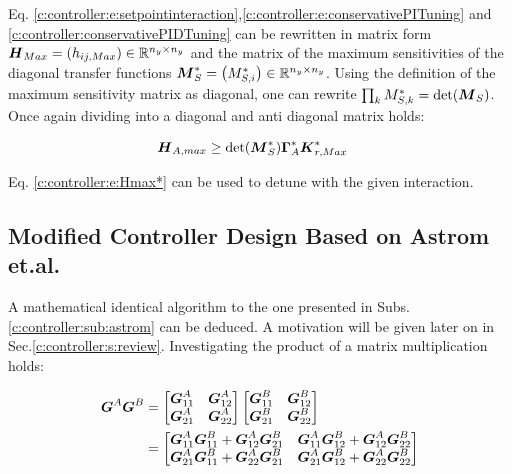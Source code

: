 Eq. \ref{c:controller:e:setpointinteraction},\ref{c:controller:e:conservativePITuning} and \ref{c:controller:conservativePIDTuning} can be rewritten in matrix form $\mbox{\boldmath$H$}_{Max} = \left(h_{ij,Max}\right) \in \mathbb{R}^{n_y \times n_y}$ and the matrix of the maximum sensitivities of the diagonal transfer functions $\mbox{\boldmath$M$}_S^* = \left(M_{S,i}^*\right) \in \mathbb{R}^{n_y \times n_y}$. Using the definition of the maximum sensitivity matrix as diagonal, one can rewrite $\prod_k M_{S,k}^* = \det(\mbox{\boldmath$M$}_S) $. Once again dividing into a diagonal and anti diagonal matrix holds:

\begin{align}
\begin{split}
\mbox{\boldmath$H$}_{A,max} &\geq \det(\mbox{\boldmath$M$}_S^*) \mbox{\boldmath$\Gamma$}_A^* \mbox{\boldmath$K$}_{r,Max}^* 
\end{split}
\label{c:controller:e:Hmax*}
\end{align}

Eq. \ref{c:controller:e:Hmax*} can be used to detune with the given interaction.

\subsection{Modified Controller Design Based on Astrom et.al.}
\label{c:controller:sub:modified}

A mathematical identical algorithm to the one presented in Subs.\ref{c:controller:sub:astrom} can be deduced. A motivation will be given later on in Sec.\ref{c:controller:s:review}. Investigating the product of a matrix multiplication holds: 

\begin{align}
\begin{split}
\mbox{\boldmath$G$}^{A} \mbox{\boldmath$G$}^{B} &= 
\begin{bmatrix}
\mbox{\boldmath$G$}_{11}^{A} & \mbox{\boldmath$G$}_{12}^{A} \\
\mbox{\boldmath$G$}_{21}^{A} & \mbox{\boldmath$G$}_{22}^{A} 
\end{bmatrix}
\begin{bmatrix}
\mbox{\boldmath$G$}_{11}^{B} & \mbox{\boldmath$G$}_{12}^{B} \\
\mbox{\boldmath$G$}_{21}^{B} & \mbox{\boldmath$G$}_{22}^{B} 
\end{bmatrix}\\
&= \begin{bmatrix}
\mbox{\boldmath$G$}_{11}^{A}\mbox{\boldmath$G$}_{11}^{B} + \mbox{\boldmath$G$}_{12}^{A}\mbox{\boldmath$G$}_{21}^{B} & \mbox{\boldmath$G$}_{11}^{A}\mbox{\boldmath$G$}_{12}^{B} + \mbox{\boldmath$G$}_{12}^{A}\mbox{\boldmath$G$}_{22}^{B} \\
\mbox{\boldmath$G$}_{21}^{A}\mbox{\boldmath$G$}_{11}^{B} + \mbox{\boldmath$G$}_{22}^{A}\mbox{\boldmath$G$}_{21}^{B} &
\mbox{\boldmath$G$}_{21}^{A}\mbox{\boldmath$G$}_{12}^{B} + \mbox{\boldmath$G$}_{22}^{A}\mbox{\boldmath$G$}_{22}^{B}
\end{bmatrix}
\end{split}
\label{c:controller:e:matrixmult}
\end{align}

